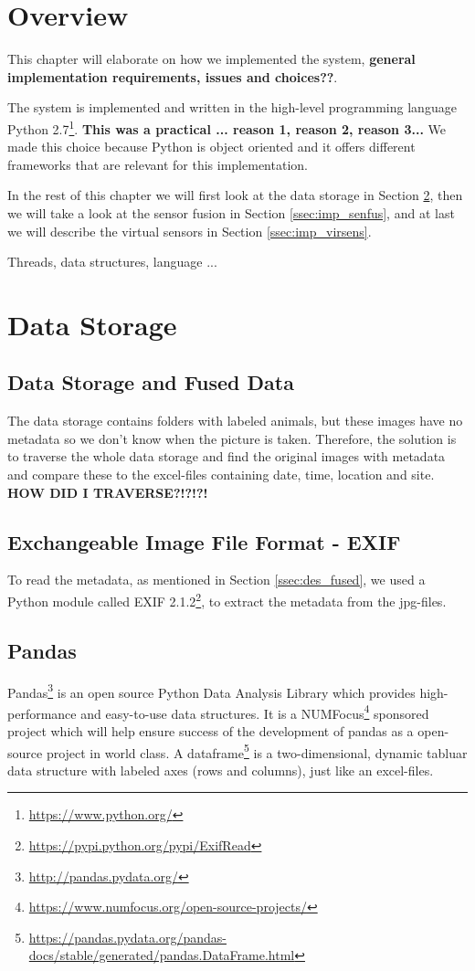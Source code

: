 \documentclass[USenglish]{uit-thesis}
\begin{document}
\section{Overview}
This chapter will elaborate on how we implemented the system, \textbf{general implementation requirements, issues and choices??}.

The system is implemented and written in the high-level programming language Python 2.7\footnote{\url{https://www.python.org/}}. \textbf{ This was a practical ... reason 1, reason 2, reason 3...}
We made this choice because Python is object oriented and it offers different frameworks that are relevant for this implementation. %


In the rest of this chapter we will first look at the data storage in Section \ref{ssec:imp_storage}, then we will take a look at the sensor fusion in Section \ref{ssec:imp_senfus}, and at last we will describe the virtual sensors in Section \ref{ssec:imp_virsens}.

Threads, data structures, language ...

\section{Data Storage} \label{ssec:imp_storage}
\subsection{Data Storage and Fused Data} \label{ssec:storage_fused}
The data storage contains folders with labeled animals, but these images have no metadata so we don't know when the picture is taken. Therefore, the solution is to traverse the whole data storage and find the original images with metadata and compare these to the excel-files containing date, time, location and site.
\textbf{HOW DID I TRAVERSE?!?!?!}

\subsection{Exchangeable Image File Format - EXIF}
To read the metadata, as mentioned in Section \ref{ssec:des_fused}, we used a Python module called  EXIF 2.1.2\footnote{\url{https://pypi.python.org/pypi/ExifRead}}, to extract the metadata from the jpg-files.

\subsection{Pandas}
Pandas\footnote{\url{http://pandas.pydata.org/}} is an open source Python Data Analysis Library which provides high-performance and easy-to-use data structures. It is a NUMFocus\footnote{\url{https://www.numfocus.org/open-source-projects/}} sponsored project which will help ensure success of the development of pandas as a open-source project in world class. A dataframe\footnote{\url{https://pandas.pydata.org/pandas-docs/stable/generated/pandas.DataFrame.html}} is a two-dimensional, dynamic tabluar data structure with labeled axes (rows and columns), just like an excel-files.
\end{document}
